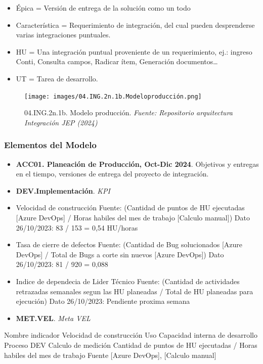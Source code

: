 \documentclass[
  paper=a4,
  ,captions=tableheading
]{scrartcl}
\providecommand{\tightlist}{%
  \setlength{\itemsep}{0pt}\setlength{\parskip}{0pt}}
\begin{document}
\begin{itemize}
\tightlist
\item
  Épica = Versión de entrega de la solución como un todo
\item
  Característica = Requerimiento de integración, del cual pueden
  desprenderse varias integraciones puntuales.
\item
  HU = Una integración puntual proveniente de un requerimiento, ej.:
  ingreso Conti, Consulta campos, Radicar ítem, Generación
  documentos\ldots{}
\item
  UT = Tarea de desarrollo.
\end{itemize}

\begin{figure}
\centering
\texttt{[image: images/04.ING.2n.1b.Modeloproducción.png]}
\caption{04.ING.2n.1b. Modelo producción. \emph{Fuente: Repositorio
arquitectura Integración JEP
(2024)}}\label{fig:id-9938d5859d53450fa5c5c953d9ce33cb}
\end{figure}

\subsubsection{Elementos del Modelo}\label{sec:elementos-del-modelo-1}

\begin{itemize}
\item
  \textbf{ACC01. Planeación de Producción, Oct-Dic 2024}. Objetivos y
  entregas en el tiempo, versiones de entrega del proyecto de
  integración.
\item
  \textbf{DEV.Implementación}. \emph{KPI}
\item
  Velocidad de construcción Fuente: (Cantidad de puntos de HU ejecutadas
  {[}Azure DevOps{]} / Horas habiles del mes de trabajo {[}Calculo
  manual{]}) Dato 26/10/2023: 83 / 153 = 0,54 HU/horas
\item
  Tasa de cierre de defectos Fuente: (Cantidad de Bug solucionados
  {[}Azure DevOps{]} / Total de Bugs a corte sin nuevos {[}Azure
  DevOps{]}) Dato 26/10/2023: 81 / 920 = 0,088
\item
  Indice de dependecia de Lider Técnico Fuente: (Cantidad de actividades
  retrazadas semanales segun las HU planeadas / Total de HU planeadas
  para ejecución) Dato 26/10/2023: Pendiente proxima semana
\item
  \textbf{MET.VEL}. \emph{Meta VEL}
\end{itemize}

Nombre indicador Velocidad de construcción Uso Capacidad interna de
desarrollo Proceso DEV Calculo de medición Cantidad de puntos de HU
ejecutadas / Horas habiles del mes de trabajo Fuente {[}Azure DevOps{]},
{[}Calculo manual{]}
\end{document}
